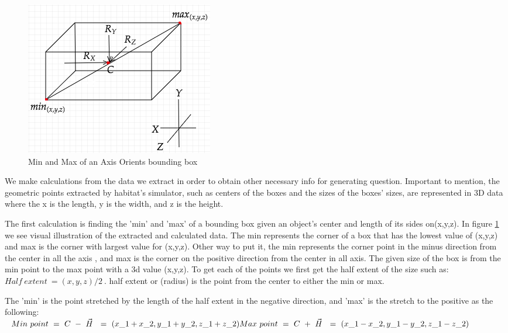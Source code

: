 \begin{figure}[H]
\centering
\includegraphics[scale=0.5]{images/Geoinfo.png}
\caption{Min and Max of an Axis Orients bounding box}
\label{fig:aabb}
\end{figure}


We make calculations from the data we extract in order to obtain other necessary info for generating question. Important to mention, the geometric points extracted by habitat's simulator, such as centers of the boxes and the sizes of the boxes' sizes, are represented in 3D data where the  x is the length, y is the width, and z is the height. 

The first calculation is finding the 'min' and 'max' of a bounding box given an object's center and length of its sides on(x,y,z). In figure \ref{fig:aabb} we see visual illustration of the extracted and calculated data. The min represents the corner of a box that has the lowest value of (x,y,z) and max is the corner with largest value for (x,y,z). Other way to put it, the min represents the corner point in the minus direction from the center in all the axis , and max is the corner on the positive direction from the center in all axis. 
The given size of the box is from the min point to the max point with a 3d value (x,y,z). To get each of the points we first get the half extent of the size such as: \begin{math} Half\ extent\ =(x,y,z) /2\ \end{math}. half extent or (radius) is the point from the center to either the min or max. 

The 'min' is the point stretched by the length of the half extent in the negative direction, and 'max' is the stretch to the positive as the following:   \\ 
\begin{math}
Min\ point\ =\ C\ -\ \vec{H} \ \ =\ ( x\_{1} +x\_{2} ,y\_{1} +y\_{2} ,z\_{1} +z\_{2}{}) \  \\
Max\ point\ =\ C\ +\ \vec{H} \ \ =\ ( x\_{1} -x\_{2} ,y\_{1} -y\_{2} ,z\_{1} -z\_{2}{}) \ 
\end{math}

